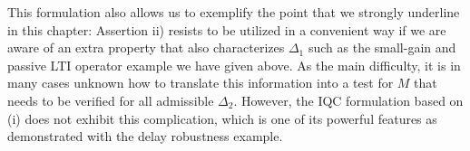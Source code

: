 This formulation also allows us to exemplify the point that we strongly underline in this chapter: Assertion ii) 
resists to be utilized in a convenient way if we are aware of an extra property that also characterizes $\Delta_1$ 
such as the small-gain and passive LTI operator example we have given above. 
As the main difficulty, it is in many cases unknown how to translate this information into a test for $M$ that needs 
to be verified for all admissible $\Delta_2$. However, the IQC formulation based on (i) does not exhibit this 
complication, which is one of its powerful features as demonstrated with the delay robustness example. 
